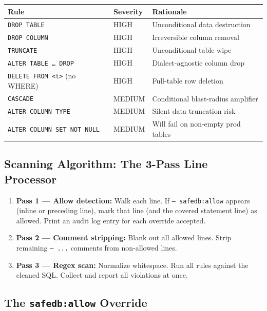 \documentclass[12pt,a4paper]{report}
\begin{document}
\begin{center}
\begin{tabular}{@{}lll@{}}
\toprule
\textbf{Rule} & \textbf{Severity} & \textbf{Rationale} \\
\midrule
\texttt{DROP TABLE}               & HIGH   & Unconditional data destruction \\
\texttt{DROP COLUMN}              & HIGH   & Irreversible column removal \\
\texttt{TRUNCATE}                 & HIGH   & Unconditional table wipe \\
\texttt{ALTER TABLE … DROP}       & HIGH   & Dialect-agnostic column drop \\
\texttt{DELETE FROM <t>} (no WHERE) & HIGH & Full-table row deletion \\
\texttt{CASCADE}                  & MEDIUM & Conditional blast-radius amplifier \\
\texttt{ALTER COLUMN TYPE}        & MEDIUM & Silent data truncation risk \\
\texttt{ALTER COLUMN SET NOT NULL} & MEDIUM & Will fail on non-empty prod tables \\
\bottomrule
\end{tabular}
\end{center}

\subsection{Scanning Algorithm: The 3-Pass Line Processor}

\begin{enumerate}
  \item \textbf{Pass 1 — Allow detection:} Walk each line. If \texttt{-- safedb:allow}
        appears (inline or preceding line), mark that line (and the covered statement
        line) as allowed. Print an audit log entry for each override accepted.

  \item \textbf{Pass 2 — Comment stripping:} Blank out all allowed lines. Strip
        remaining \texttt{-- ...} comments from non-allowed lines.

  \item \textbf{Pass 3 — Regex scan:} Normalize whitespace. Run all rules against
        the cleaned SQL. Collect and report all violations at once.
\end{enumerate}

\subsection{The \texttt{safedb:allow} Override}
\end{document}
